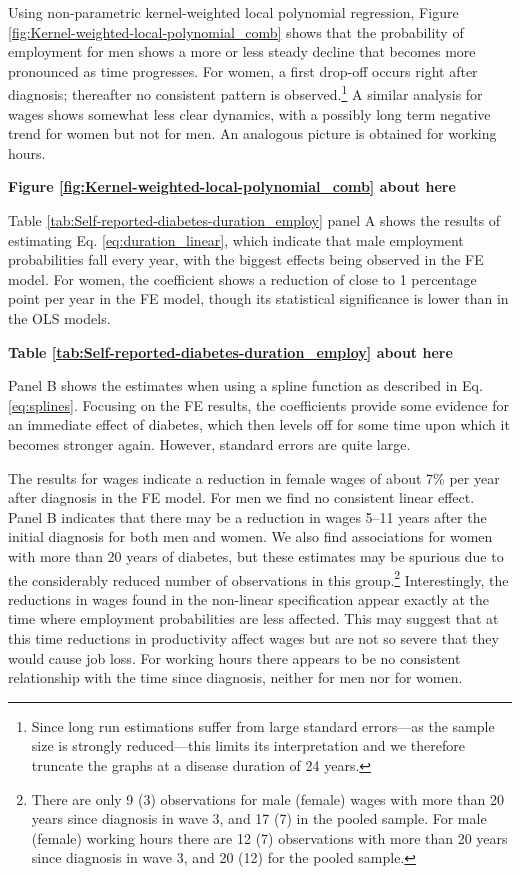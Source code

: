 \documentclass[12pt,english]{article}
\begin{document}
Using non-parametric kernel-weighted local polynomial regression, Figure \ref{fig:Kernel-weighted-local-polynomial_comb} shows that the probability of employment for men shows a more or less steady decline that becomes more pronounced as time progresses. For women,
a first drop-off occurs right after diagnosis; thereafter no consistent pattern is observed.\footnote{Since long run estimations suffer from large standard errors---as the sample size is strongly reduced---this limits its interpretation and we therefore truncate the graphs at a disease duration of 24 years.} A similar analysis for wages shows somewhat less clear dynamics, with a possibly long term negative trend for women but not for men. An analogous picture is obtained for working hours.


\begin{center}
	\textbf{Figure \ref{fig:Kernel-weighted-local-polynomial_comb} about here}
\end{center}


Table \ref{tab:Self-reported-diabetes-duration_employ} panel A shows the results of estimating Eq. \ref{eq:duration_linear}, which indicate that male employment probabilities fall every year, with the biggest effects being observed in the \ac{FE} model. For women, the coefficient shows a reduction of close to 1 percentage point per year in the \ac{FE} model, though its statistical significance is lower than in the \ac{OLS} models. 



\begin{center}
	\textbf{Table \ref{tab:Self-reported-diabetes-duration_employ} about here}
\end{center}


Panel B shows the estimates when using a spline function as described in Eq. \ref{eq:splines}. Focusing on the \ac{FE} results, the coefficients provide some evidence for an immediate effect of diabetes, which then levels off for some time upon which it becomes stronger again. However, standard errors are quite large.

The results for wages indicate a reduction in female wages of about 7\% per year after diagnosis in the \ac{FE} model. For men we find no consistent linear effect. Panel B indicates that there may be a reduction in wages 5--11 years after the initial diagnosis for both men and women. We also find associations for women with more than 20 years of diabetes, but these estimates may be spurious due to the considerably reduced number of observations in this group.\footnote{There are only 9 (3) observations for male (female) wages with more than 20 years since diagnosis in wave 3, and 17 (7) in the pooled sample. For male (female) working hours there are 12 (7) observations with more than 20 years since diagnosis in wave 3, and 20 (12) for the pooled sample.} Interestingly, the reductions in wages found in the non-linear specification appear exactly at the time where employment probabilities are less affected. This may suggest that at this time reductions in productivity affect wages but are not so severe that they would cause job loss. For working hours there appears to be no consistent relationship with the time since diagnosis, neither for men nor for women.
\end{document}
